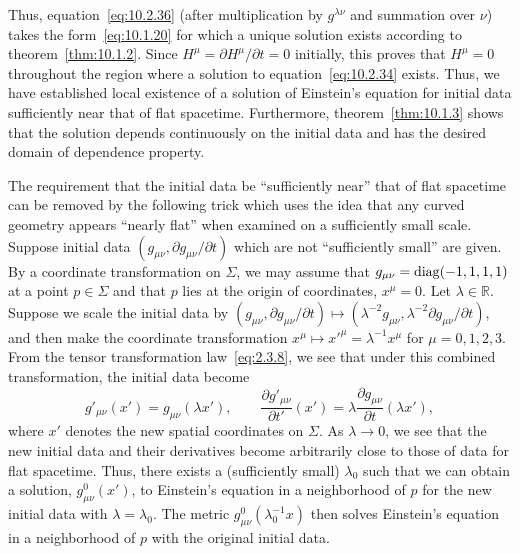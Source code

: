Thus, equation~\eqref{eq:10.2.36} (after multiplication by \(g^{\lambda\nu}\) and
summation over \(\nu\)) takes the form~\eqref{eq:10.1.20} for which a unique
solution exists according to theorem~\ref{thm:10.1.2}. Since
\(H^\mu=\partial H^\mu/\partial t=0\) initially, this proves that \(H^\mu=0\)
throughout the region where a solution to equation~\eqref{eq:10.2.34} exists. Thus,
we have established local existence of a solution of Einstein's equation for initial
data sufficiently near that of flat spacetime. Furthermore, theorem~\ref{thm:10.1.3}
shows that the solution depends continuously on the initial data and has the desired
domain of dependence property.

The requirement that the initial data be ``sufficiently near'' that of flat spacetime can
be removed by the following trick which uses the idea that any curved geometry
appears ``nearly flat'' when examined on a sufficiently small scale. Suppose initial
data \((g_{\mu\nu},\partial g_{\mu\nu}/\partial t)\) which are not ``sufficiently small''
are given. By a coordinate transformation on \(\Sigma\), we may assume that
\(g_{\mu\nu}=\operatorname{diag}(-1,1,1,1)\) at a point \(p\in\Sigma\) and that \(p\) lies at the
origin of coordinates, \(x^\mu=0\). Let \(\lambda\in\mathbb R\). Suppose we scale
the initial data by
\((g_{\mu\nu},\partial g_{\mu\nu}/\partial t)
\mapsto(\lambda^{-2}g_{\mu\nu},\lambda^{-2}\partial g_{\mu\nu}/\partial t)\), and
then make the coordinate transformation \(x^\mu\mapsto x'^\mu=\lambda^{-1}x^\mu\)
for \(\mu=0,1,2,3\). From the tensor transformation law~\eqref{eq:2.3.8}, we see
that under this combined transformation, the initial data become
\begin{equation*}
  g'_{\mu\nu}(x')=g_{\mu\nu}(\lambda x'),
  \qquad
  \frac{\partial g'_{\mu\nu}}{\partial t'}(x')
  =\lambda\frac{\partial g_{\mu\nu}}{\partial t}(\lambda x'),
\end{equation*}
where \(x'\) denotes the new spatial coordinates on \(\Sigma\). As \(\lambda\to0\),
we see that the new initial data and their derivatives become arbitrarily close to those
of data for flat spacetime. Thus, there exists a (sufficiently small) \(\lambda_0\) such
that we can obtain a solution, \(g^0_{\mu\nu}(x')\), to Einstein's equation in a
neighborhood of \(p\) for the new initial data with \(\lambda=\lambda_0\). The metric
\(g^0_{\mu\nu}(\lambda_0^{-1}x)\) then solves Einstein's equation in a neighborhood
of \(p\) with the original initial data.

